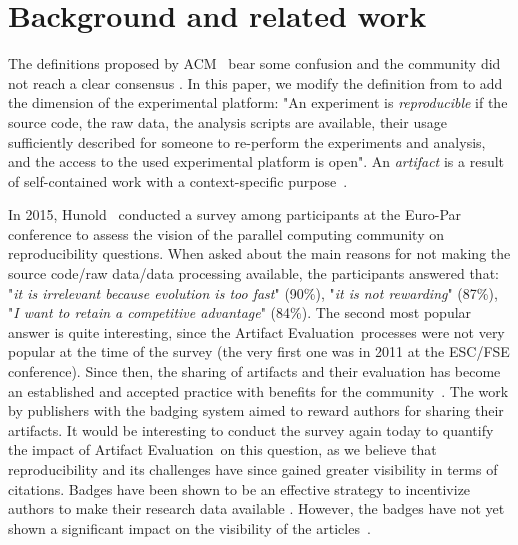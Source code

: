 \documentclass[sigconf,natbib=false]{acmart}
\newcommand{\aeval}{Artifact Evaluation}
\begin{document}
%
\section{Background and related work}\label{sec:background}

The definitions proposed by ACM\ \cite{acm-badges} bear some confusion and the community did not reach a clear consensus \cite{plesser2018reproducibility, barba2018terminologies}.
In this paper, we modify the definition from \cite{rougier2019rescience} to add the dimension of the experimental platform:
"An experiment is \emph{reproducible} if the source code, the raw data, the analysis scripts are available, their usage sufficiently described for someone to re-perform the experiments and analysis, and the access to the used experimental platform is open".
An \emph{artifact} is a result of self-contained work with a context-specific purpose\ \cite{mendez2019artefacts}.

In 2015, Hunold\ \cite{hunold2015survey} conducted a survey among participants at the Euro-Par conference to assess the vision of the parallel computing community on reproducibility questions. 
When asked about the main reasons for not making the source code/raw data/data processing available, the participants answered that: "\emph{it is irrelevant because evolution is too fast}" (90\%), "\emph{it is not rewarding}" (87\%), "\emph{I want to retain a competitive advantage}" (84\%).
The second most popular answer is quite interesting, since the \aeval\ processes were not very popular at the time of the survey (the very first one was in 2011 at the ESC/FSE conference).
Since then, the sharing of artifacts and their evaluation has become an established and accepted practice with benefits for the community\ \cite{hermann2022has}.
The work by publishers with the badging system aimed to reward authors for sharing their artifacts.
It would be interesting to conduct the survey again today to quantify the impact of \aeval\ on this question, as we believe that reproducibility and its challenges have since gained greater visibility in terms of citations.
Badges have been shown to be an effective strategy to incentivize authors to make their research data available \cite{kidwell2016badges, rowhani2017incentives}.
However, the badges have not yet shown a significant impact on the visibility of the articles\ \cite{winter2022retrospective, frachtenberg2022research, heumuller2020publish}. 
\end{document}
